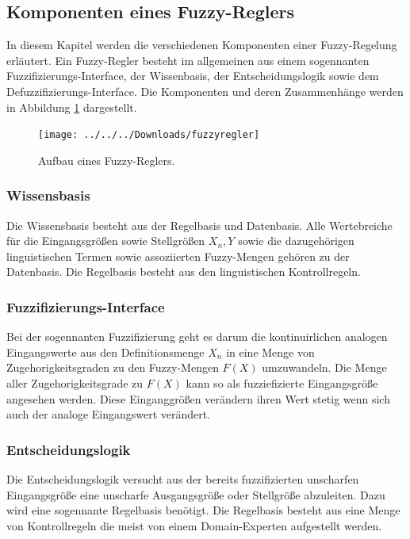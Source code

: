 \documentclass[12pt,a4paper,bibliography=totocnumbered,listof=totocnumbered]{article}
\theoremstyle{Umgebung}
\begin{document}
\subsection{Komponenten eines Fuzzy-Reglers}

In diesem Kapitel werden die verschiedenen Komponenten einer Fuzzy-Regelung erläutert. Ein Fuzzy-Regler besteht im allgemeinen aus einem sogennanten Fuzzifizierungs-Interface, der Wissenbasis, der Entscheidungslogik sowie dem Defuzzifizierungs-Interface. Die Komponenten und deren Zusammenhänge werden in Abbildung \ref{fig:fuzzyregler} dargestellt.

\begin{figure}
	\centering
	\texttt{[image: ../../../Downloads/fuzzyregler]}
	\caption{Aufbau eines Fuzzy-Reglers.}
	\label{fig:fuzzyregler}
\end{figure}

\subsubsection{Wissensbasis}

Die Wissensbasis besteht aus der Regelbasis und Datenbasis. Alle Wertebreiche für die Eingangsgrößen sowie Stellgrößen $X_n, Y$ sowie die dazugehörigen linguistischen Termen sowie assoziierten Fuzzy-Mengen gehören zu der Datenbasis. Die Regelbasis besteht aus den linguistischen Kontrollregeln.

\subsubsection{Fuzzifizierungs-Interface}

Bei der sogennanten Fuzzifizierung geht es darum die kontinuirlichen analogen Eingangswerte aus den Definitionsmenge $X_n$ in eine Menge von Zugehorigkeitsgraden zu den Fuzzy-Mengen $F(X)$ umzuwandeln. Die Menge aller Zugehorigkeitsgrade zu $F(X)$ kann so als fuzziefizierte Eingangsgröße angesehen werden. Diese Einganggrößen verändern ihren Wert stetig wenn sich auch der analoge Eingangswert verändert. 

\subsubsection{Entscheidungslogik}

Die Entscheidungslogik versucht aus der bereits fuzzifizierten unscharfen Eingangsgröße eine unscharfe Ausgangsgröße oder Stellgröße abzuleiten. Dazu wird eine sogennante Regelbasis benötigt. Die Regelbasis besteht aus eine Menge von Kontrollregeln die meist von einem Domain-Experten aufgestellt werden.
\end{document}
